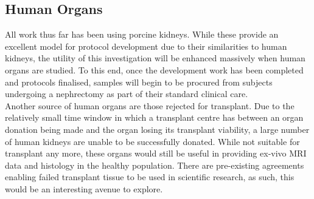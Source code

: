\subsection{Human Organs}
All work thus far has been using porcine kidneys. While these provide an excellent model for protocol development due to their similarities to human kidneys, the utility of this investigation will be enhanced massively when human organs are studied. To this end, once the development work has been completed and protocols finalised, samples will begin to be procured from subjects undergoing a nephrectomy as part of their standard clinical care.\\

Another source of human organs are those rejected for transplant. Due to the relatively small time window in which a transplant centre has between an organ donation being made and the organ losing its transplant viability, a large number of human kidneys are unable to be successfully donated. While not suitable for transplant any more, these organs would still be useful in providing ex-vivo \ac{MRI} data and histology in the healthy population. There are pre-existing agreements enabling failed transplant tissue to be used in scientific research, as such, this would be an interesting avenue to explore.